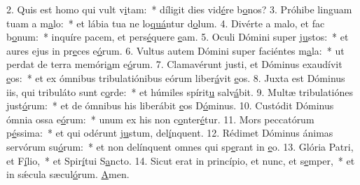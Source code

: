 2. Quis est homo qui vult v\uline{i}tam:~* díligit dies vid\uline{é}re b\uline{o}nos?
3. Próhibe linguam tuam a m\uline{a}lo:~* et lábia tua ne lo\uline{quá}ntur d\uline{o}lum.
4. Divérte a malo, et fac b\uline{o}num:~* inquíre pacem, et pers\uline{é}quere \uline{e}am.
5. Oculi Dómini super j\uline{u}stos:~* et aures ejus in pr\uline{e}ces e\uline{ó}rum.
6. Vultus autem Dómini super faciéntes m\uline{a}la:~* ut perdat de terra memóri\uline{a}m e\uline{ó}rum.
7. Clamavérunt justi, et Dóminus exaudívit \uline{e}os:~* et ex ómnibus tribulatiónibus eórum liber\uline{á}vit \uline{e}os.
8. Juxta est Dóminus iis, qui tribuláto sunt c\uline{o}rde:~* et húmiles spírit\uline{u} salv\uline{á}bit.
9. Multæ tribulatiónes just\uline{ó}rum:~* et de ómnibus his liberábit \uline{e}os D\uline{ó}minus.
10. Custódit Dóminus ómnia ossa e\uline{ó}rum:~* unum ex his non c\uline{o}nter\uline{é}tur.
11. Mors peccatórum p\uline{é}ssima:~* et qui odérunt j\uline{u}stum, del\uline{í}nquent.
12. Rédimet Dóminus ánimas servórum su\uline{ó}rum:~* et non delínquent omnes qui sp\uline{e}rant in \uline{e}o.
13. Glória Patri, et F\uline{í}lio,~* et Spir\uline{í}tui S\uline{a}ncto.
14. Sicut erat in princípio, et nunc, et s\uline{e}mper,~* et in sǽcula sæcul\uline{ó}rum. \uline{A}men.

